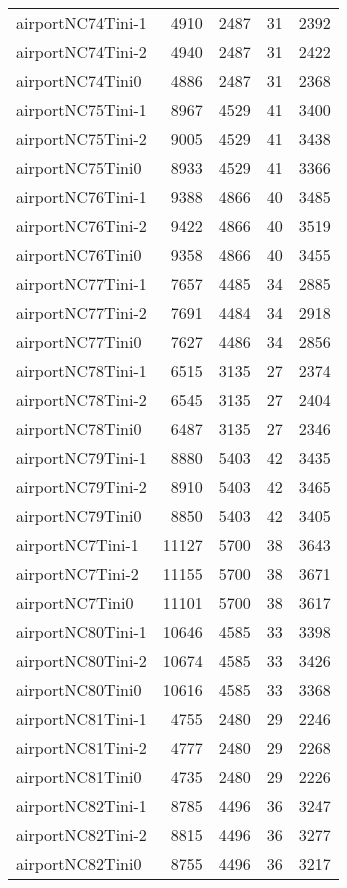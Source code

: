 \begin{longtable}{lrrrr}
airportNC74Tini-1 & 4910 & 2487 & 31 & 2392 \\
airportNC74Tini-2 & 4940 & 2487 & 31 & 2422 \\
airportNC74Tini0 & 4886 & 2487 & 31 & 2368 \\
airportNC75Tini-1 & 8967 & 4529 & 41 & 3400 \\
airportNC75Tini-2 & 9005 & 4529 & 41 & 3438 \\
airportNC75Tini0 & 8933 & 4529 & 41 & 3366 \\
airportNC76Tini-1 & 9388 & 4866 & 40 & 3485 \\
airportNC76Tini-2 & 9422 & 4866 & 40 & 3519 \\
airportNC76Tini0 & 9358 & 4866 & 40 & 3455 \\
airportNC77Tini-1 & 7657 & 4485 & 34 & 2885 \\
airportNC77Tini-2 & 7691 & 4484 & 34 & 2918 \\
airportNC77Tini0 & 7627 & 4486 & 34 & 2856 \\
airportNC78Tini-1 & 6515 & 3135 & 27 & 2374 \\
airportNC78Tini-2 & 6545 & 3135 & 27 & 2404 \\
airportNC78Tini0 & 6487 & 3135 & 27 & 2346 \\
airportNC79Tini-1 & 8880 & 5403 & 42 & 3435 \\
airportNC79Tini-2 & 8910 & 5403 & 42 & 3465 \\
airportNC79Tini0 & 8850 & 5403 & 42 & 3405 \\
airportNC7Tini-1 & 11127 & 5700 & 38 & 3643 \\
airportNC7Tini-2 & 11155 & 5700 & 38 & 3671 \\
airportNC7Tini0 & 11101 & 5700 & 38 & 3617 \\
airportNC80Tini-1 & 10646 & 4585 & 33 & 3398 \\
airportNC80Tini-2 & 10674 & 4585 & 33 & 3426 \\
airportNC80Tini0 & 10616 & 4585 & 33 & 3368 \\
airportNC81Tini-1 & 4755 & 2480 & 29 & 2246 \\
airportNC81Tini-2 & 4777 & 2480 & 29 & 2268 \\
airportNC81Tini0 & 4735 & 2480 & 29 & 2226 \\
airportNC82Tini-1 & 8785 & 4496 & 36 & 3247 \\
airportNC82Tini-2 & 8815 & 4496 & 36 & 3277 \\
airportNC82Tini0 & 8755 & 4496 & 36 & 3217 \\

\end{longtable}
